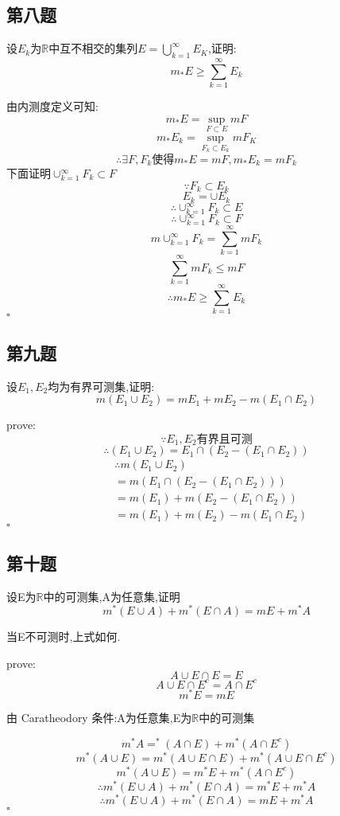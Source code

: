 \documentclass[a4paper]{article}
\begin{document}
    \subsection{第八题}
    设${E_k}$为$\mathbb{R}$中互不相交的集列$E=\bigcup_{k=1}^{\infty}E_K$,证明:
    \[m_{*}E\geq \sum_{k=1}^{\infty}E_k\]

        由内测度定义可知:   
        \[m_{*}E=\sup_{F\subset E}mF\]
        \[m_{*}E_k=\sup_{F_k\subset E_k}mF_K\]
        \[\therefore \exists F,F_k \text{使得}m_{*}E=mF,m_{*}E_k=mF_k\]
        下面证明$\cup_{k=1}^{\infty}F_k\subset F$
        \[\because F_k \subset E_k\]
        \[E_k=\cup E_k\]
        \[\therefore \cup_{k=1}^{\infty}F_k\subset E\]
        \[\therefore \cup_{k=1}^{\infty}F_k\subset F\]
        \[m\cup_{k=1}^{\infty}F_k = \sum_{k=1}^{\infty}mF_k\]
        \[\sum_{k=1}^{\infty}mF_k \le mF\]
        \[\therefore m_{*}E\geq \sum_{k=1}^{\infty}E_k\]
    \hfill $\square$

    \subsection{第九题}
    设$E_1,E_2$均为有界可测集,证明:
    \[m(E_1\cup E_2)=mE_1+mE_2-m(E_1 \cap E_2)\]

    prove:
    \[\because E_1,E_2 \text{有界且可测}\]
    \[\therefore (E_1 \cup E_2) = E_1 \cap (E_2 - (E_1 \cap E_2))\]
    \begin{align*}
        &\therefore m(E_1 \cup E_2)\\
        & = m(E_1 \cap (E_2 - (E_1 \cap E_2)))\\
        & = m(E_1) + m(E_2 - (E_1 \cap E_2))\\
        & = m(E_1) + m(E_2) - m(E_1 \cap E_2)
    \end{align*}
    \hfill $\square$

    \subsection{第十题}
    设E为$\mathbb{R}$中的可测集,A为任意集,证明
    \[m^{*}(E\cup A)+ m^*(E\cap A)=mE+m^{*}A\]

    当E不可测时,上式如何.

    prove: 
    \[A\cup E \cap E = E\]
    \[A\cup E \cap E^c = A\cap E^c\]
    \[m^*E = mE\]

    由 Caratheodory 条件:A为任意集,E为$\mathbb{R}$中的可测集

    \[m^*A=^*(A\cap E) + m^*(A\cap E^c)\]
    \[m^*(A\cup E)=m^*(A\cup E \cap E) + m^*(A\cup E \cap E^c)\]
    \[m^*(A\cup E)=m^*E+m^*(A\cap E^c)\]
    \[\therefore m^{*}(E\cup A)+ m^*(E\cap A)=m^*E+m^{*}A\]
    \[\therefore m^{*}(E\cup A)+ m^*(E\cap A)=mE+m^{*}A\]
    \hfill $\square$
\end{document}
